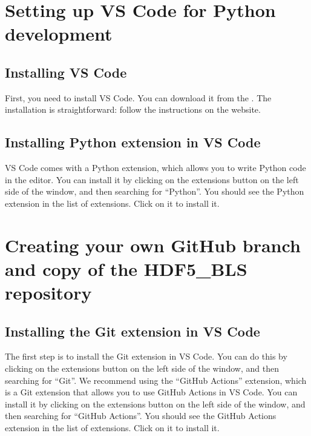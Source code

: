 \documentclass[letterpaper,10pt,english]{sphinxmanual}
\begin{document}
\section{Setting up VS Code for Python development}
\label{\detokenize{source/developer/setup:setting-up-vs-code-for-python-development}}

\subsection{Installing VS Code}
\label{\detokenize{source/developer/setup:installing-vs-code}}
\sphinxAtStartPar
First, you need to install VS Code. You can download it from the . The installation is straightforward: follow the instructions on the website.


\subsection{Installing Python extension in VS Code}
\label{\detokenize{source/developer/setup:installing-python-extension-in-vs-code}}
\sphinxAtStartPar
VS Code comes with a Python extension, which allows you to write Python code in the editor. You can install it by clicking on the extensions button on the left side of the window, and then searching for “Python”. You should see the Python extension in the list of extensions. Click on it to install it.



\section{Creating your own GitHub branch and copy of the HDF5\_BLS repository}
\label{\detokenize{source/developer/setup:creating-your-own-github-branch-and-copy-of-the-hdf5-bls-repository}}

\subsection{Installing the Git extension in VS Code}
\label{\detokenize{source/developer/setup:installing-the-git-extension-in-vs-code}}
\sphinxAtStartPar
The first step is to install the Git extension in VS Code. You can do this by clicking on the extensions button on the left side of the window, and then searching for “Git”. We recommend using the “GitHub Actions” extension, which is a Git extension that allows you to use GitHub Actions in VS Code. You can install it by clicking on the extensions button on the left side of the window, and then searching for “GitHub Actions”. You should see the GitHub Actions extension in the list of extensions. Click on it to install it.
\end{document}
